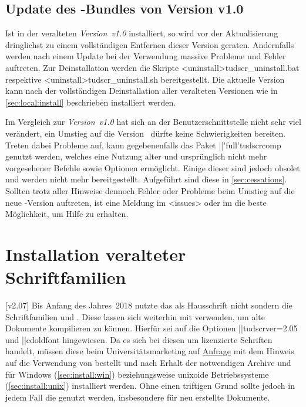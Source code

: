 \subsection{Update des \TUDScript-Bundles von Version v1.0}
%
Ist \TUDScript in der veralteten \emph{Version~v1.0} installiert, so wird vor 
der Aktualisierung dringlichst zu einem vollständigen Entfernen dieser Version 
geraten. Andernfalls werden nach einem Update bei der Verwendung massive 
Probleme und Fehler auftreten. Zur Deinstallation werden die Skripte 
\GitHubDownload*<uninstall>{tudscr_uninstall.bat} respektive
\GitHubDownload*<uninstall>{tudscr_uninstall.sh} bereitgestellt. Die aktuelle 
Version~\vTUDScript{} kann nach der vollständigen Deinstallation aller 
veralteten Versionen wie in \autoref{sec:local:install} beschrieben installiert 
werden.

Im Vergleich zur \emph{Version~v1.0} hat sich an der Benutzerschnittstelle 
nicht sehr viel verändert, ein Umstieg auf die Version~\vTUDScript{} dürfte 
keine Schwierigkeiten bereiten. Treten dabei Probleme auf, kann gegebenenfalls 
das Paket \Package||'full'{tudscrcomp} genutzt werden, welches eine Nutzung 
alter und ursprünglich nicht mehr vorgesehener Befehle sowie Optionen 
ermöglicht. Einige dieser sind jedoch obsolet und werden nicht mehr 
bereitgestellt. Aufgeführt sind diese in \autoref{sec:cessations}. Sollten 
trotz aller Hinweise dennoch Fehler oder Probleme beim Umstieg auf die neue 
\TUDScript-Version auftreten, ist eine Meldung im \GitHubRepo<issues> oder im 
\Forum die beste Möglichkeit, um Hilfe zu erhalten.



\section{%
  Installation veralteter Schriftfamilien%
  \label{sec:install:fonts}%
}
%
%
[v2.07]
Bis Anfang des Jahres~2018 nutzte das \TUDCD als Hausschrift nicht \OpenSans 
sondern die Schriftfamilien \Univers und \DIN. Diese lassen sich weiterhin mit 
\TUDScript verwenden, um alte Dokumente kompilieren zu können. Hierfür sei auf 
die Optionen \Option||{tudscrver=2.05} und \Option||{cdoldfont} hingewiesen. 
Da es sich bei diesen um lizenzierte Schriften handelt, müssen diese beim 
Universitätsmarketing auf \href{https://tu-dresden.de/cd}{Anfrage} mit dem 
Hinweis auf die Verwendung von  bestellt und nach Erhalt der 
notwendigen Archive  und  für 
Windows (\autoref{sec:install:win}) beziehungsweise unixoide Betriebssysteme 
(\autoref{sec:install:unix}) installiert werden. Ohne einen triftigen Grund 
sollte jedoch in jedem Fall die \OpenSans genutzt werden, insbesondere für neu 
erstellte Dokumente.


